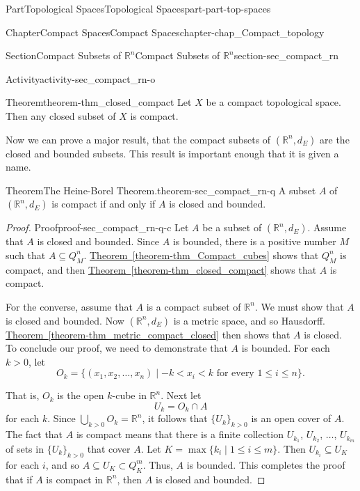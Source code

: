 \documentclass[oneside,10pt,]{book}
\newcommand{\xreffont}{\relax}
\numberwithin{equation}{chapter}
\newcommand{\R}{\mathbb{R}}
\newcommand{\lt}{<}
\newcommand{\gt}{>}
\begin{document}
\begin{partptx}{Part}{Topological Spaces}{}{Topological Spaces}{}{}{part-part-top-spaces}
\begin{chapterptx}{Chapter}{Compact Spaces}{}{Compact Spaces}{}{}{chapter-chap_Compact_topology}
\begin{sectionptx}{Section}{Compact Subsets of \(\R^n\)}{}{Compact Subsets of \(\R^n\)}{}{}{section-sec_compact_rn}
\begin{activity}{Activity}{}{activity-sec_compact_rn-o}
\begin{enumerate}[font=\bfseries,label=(\alph*),ref=\alph*]
\begin{theorem}{Theorem}{}{}{theorem-thm_closed_compact}%
Let \(X\) be a compact topological space. Then any closed subset of \(X\) is compact.%
\end{theorem}
\end{enumerate}%
\end{activity}%
Now we can prove a major result, that the compact subsets of \((\R^n, d_E)\) are the closed and bounded subsets. This result is important enough that it is given a name.%
\begin{theorem}{Theorem}{The Heine-Borel Theorem.}{}{theorem-sec_compact_rn-q}%
A subset \(A\) of \((\R^n, d_E)\) is compact if and only if \(A\) is closed and bounded.%
\end{theorem}
\begin{proof}{Proof}{}{proof-sec_compact_rn-q-c}
Let \(A\) be a subset of \((\R^n, d_E)\). Assume that \(A\) is closed and bounded. Since \(A\) is bounded, there is a positive number \(M\) such that \(A \subseteq Q^n_M\). \hyperref[theorem-thm_Compact_cubes]{Theorem~{\xreffont\ref{theorem-thm_Compact_cubes}}} shows that \(Q^n_M\) is compact, and then \hyperref[theorem-thm_closed_compact]{Theorem~{\xreffont\ref{theorem-thm_closed_compact}}} shows that \(A\) is compact.%
\par
For the converse, assume that \(A\) is a compact subset of \(\R^n\). We must show that \(A\) is closed and bounded. Now \((\R^n, d_E)\) is a metric space, and so Hausdorff. \hyperref[theorem-thm_metric_compact_closed]{Theorem~{\xreffont\ref{theorem-thm_metric_compact_closed}}} then shows that \(A\) is closed. To conclude our proof, we need to demonstrate that \(A\) is bounded. For each \(k \gt 0\), let%
\begin{equation*}
O_k = \{ (x_1,x_2, \ldots, x_n) \mid -k \lt  x_i \lt  k \text{ for every }  1 \leq i \leq n\}\text{.}
\end{equation*}
%
\par
That is, \(O_k\) is the open \(k\)-cube in \(\R^n\). Next let%
\begin{equation*}
U_k = O_k \cap A
\end{equation*}
for each \(k\). Since \(\bigcup_{k \gt 0} O_k = \R^n\), it follows that \(\{U_k\}_{k \gt 0}\) is an open cover of \(A\). The fact that \(A\) is compact means that there is a finite collection \(U_{k_1}\), \(U_{k_2}\), \(\ldots\), \(U_{k_m}\) of sets in \(\{U_k\}_{k \gt 0}\) that cover \(A\). Let \(K = \max\{k_i \mid 1 \leq i \leq m\}\). Then \(U_{k_i} \subseteq U_K\) for each \(i\), and so \(A \subseteq U_K \subset Q^m_K\). Thus, \(A\) is bounded. This completes the proof that if \(A\) is compact in \(\R^n\), then \(A\) is closed and bounded.%

\end{proof}
\end{sectionptx}
\end{chapterptx}
\end{partptx}
\end{document}
